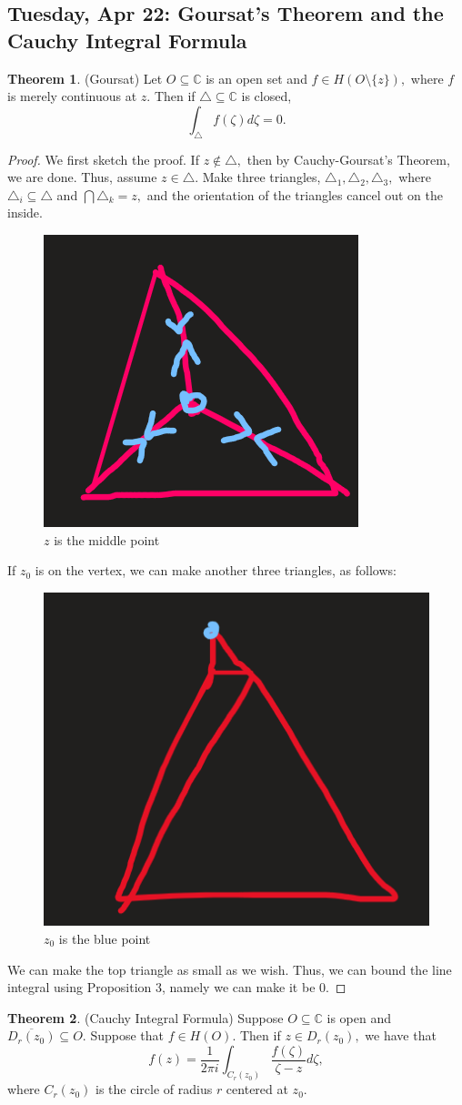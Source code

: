 \documentclass[10pt, oneside]{article}
\newcommand{\bbC}{\mathbb{C}}
\newcommand{\sm}{\setminus}
\theoremstyle{definition}
\newtheorem{thm}{Theorem}
\newcommand{\bbC}{\mathbb{C}}
\newcommand{\sm}{\setminus}
\begin{document}
\newpage
\subsection{Tuesday, Apr 22: Goursat's Theorem and the Cauchy Integral Formula}
\begin{thm}
    (Goursat) Let $O \subseteq \bbC$ is an open set and $f\in H(O \sm \{z\}),$ where $f$ is merely continuous at $z.$ Then if $\triangle \subseteq \bbC$ is closed,
    \[\int_{\triangle} f(\zeta)d\zeta = 0.\]
\end{thm}
\begin{proof}
We first sketch the proof.
    If $z \notin \triangle,$ then by Cauchy-Goursat's Theorem, we are done. Thus, assume $z\in \triangle.$ Make three triangles, $\triangle_1, \triangle_2, \triangle_3,$ where $\triangle_i \subseteq \triangle$ and $\bigcap \triangle_k = z,$ and the orientation of the triangles cancel out on the inside.  
    \begin{figure}[H]
        \centering
        \includegraphics[width=0.25\linewidth]{Images/Goursat2.png}
        \caption{$z$ is the middle point}
    \end{figure}
    If $z_0$ is on the vertex, we can make another three triangles, as follows: 
    \begin{figure}[H]
        \centering
        \includegraphics[width=0.25\linewidth]{Images/Gorusat3.png}
        \caption{$z_0$ is the blue point}
    \end{figure}
    We can make the top triangle as small as we wish. Thus, we can bound the line integral using Proposition 3, namely we can make it be $0.$ 
\end{proof}
\begin{thm}
(Cauchy Integral Formula)
    Suppose $O \subseteq \bbC$ is open and $\overline{D_r(z_0)} \subseteq O.$ Suppose that $f\in H(O).$ Then if $z\in D_r(z_0),$ we have that 
    \[f(z) = \frac{1}{2\pi i }\int_{C_r(z_0)}\frac{f(\zeta)}{\zeta - z}d\zeta,\] where $C_r(z_0)$ is the circle of radius $r$ centered at $z_0. $
\end{thm}
\end{document}
